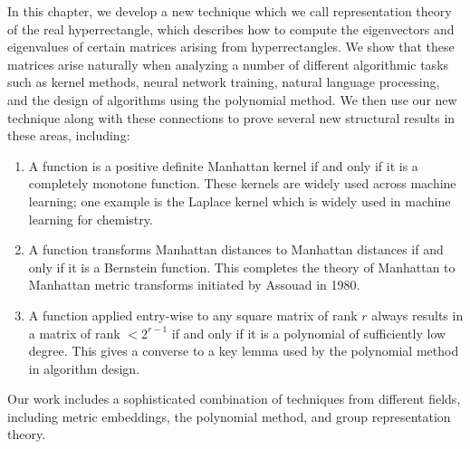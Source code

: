 

In this chapter, we develop a new technique which we call representation theory of the real hyperrectangle, which describes how to compute the eigenvectors and eigenvalues of certain matrices arising from hyperrectangles.
We show that these matrices arise naturally when analyzing a number of different algorithmic tasks such as kernel methods, neural network training, natural language processing, and the design of algorithms using the polynomial method. 
We then use our new technique along with these connections to prove several new structural results in these areas, including:
\begin{enumerate}
    \item A function is a positive definite Manhattan kernel if and only if it is a completely monotone function. These kernels are widely used across machine learning; one example is the Laplace kernel which is widely used in machine learning for chemistry.
    \item A function transforms Manhattan distances to Manhattan distances if and only if it is a Bernstein function. This completes the theory of Manhattan to Manhattan metric transforms initiated by Assouad in 1980.
    \item A function applied entry-wise to any square matrix of rank $r$ always results in a matrix of rank  $< 2^{r-1}$ if and only if it is a polynomial of sufficiently low degree. This gives a converse to a key lemma used by the polynomial method in algorithm design.
\end{enumerate} 

 Our work includes a sophisticated combination of techniques from different fields, including metric embeddings, the polynomial method, and group representation theory.




